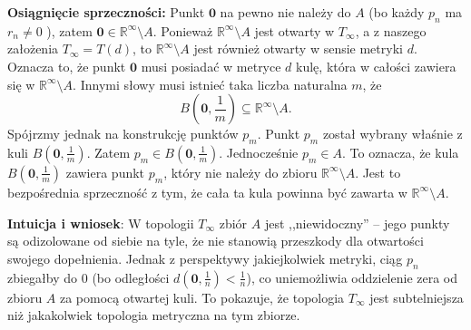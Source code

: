 \begin{eg}[1.2.2.]
\noindent \textbf{Osiągnięcie sprzeczności:} Punkt $\mathbf{0}$ na pewno nie należy do $A$ (bo każdy $p_{n}$ ma $r_{n} \neq 0$ ), zatem $\mathbf{0} \in \mathbb{R}^{\infty}\setminus A$. Ponieważ $\mathbb{R}^{\infty}\setminus A$ jest otwarty w $T_{\infty}$, a z naszego założenia $T_{\infty} = T\left( d \right) $, to $\mathbb{R}^{\infty}\setminus A$ jest również otwarty w sensie metryki $d$. Oznacza to, że punkt $\mathbf{0}$ musi posiadać w metryce $d$ kulę, która w całości zawiera się w  $\mathbb{R}^{\infty}\setminus A$. Innymi słowy musi istnieć taka liczba naturalna $m$, że
\[
B\left( \mathbf{0}, \frac{1}{m} \right) \subseteq \mathbb{R}^{\infty}\setminus A
.\] 
Spójrzmy jednak na konstrukcję punktów $p_{m}$. Punkt $p_{m}$ został wybrany właśnie z kuli $B\left( \mathbf{0}, \frac{1}{m} \right) $. Zatem $p_{m}\in B\left( \mathbf{0},\frac{1}{m} \right) $. Jednocześnie $p_{m} \in A$. To oznacza, że kula $B\left( \mathbf{0},\frac{1}{m} \right) $ zawiera punkt $p_{m}$, który nie należy do zbioru $\mathbb{R}^{\infty}\setminus A$. Jest to bezpośrednia sprzeczność z tym, że cała ta kula powinna być zawarta w $\mathbb{R}^{\infty}\setminus A$.

\noindent \textbf{Intuicja i wniosek}: W topologii $T_{\infty}$ zbiór $A$ jest ,,niewidoczny'' -- jego punkty są odizolowane od siebie na tyle, że nie stanowią przeszkody dla otwartości swojego dopełnienia. Jednak z perspektywy jakiejkolwiek metryki, ciąg $p_{n}$ zbiegałby do $0$ (bo odległości $d\left( \mathbf{0},\frac{1}{n} \right) < \frac{1}{n}$), co uniemożliwia oddzielenie zera od zbioru $A$ za pomocą otwartej kuli. To pokazuje, że topologia $T_{\infty}$ jest subtelniejsza niż jakakolwiek topologia metryczna na tym zbiorze.
\end{eg} 

